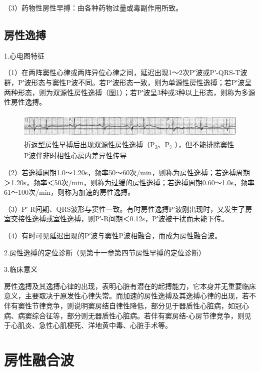 （3）药物性房性早搏：由各种药物过量或毒副作用所致。

\protect\hypertarget{text00007.htmlux5cux23subid23}{}{}

\subsection{房性逸搏}

1.心电图特征

（1）在两阵窦性心律或两阵异位心律之间，延迟出现1～2次P′波或P′-QRS-T波群，P′波形态与窦性P波不同。若P′波形态一致，则为单源性房性逸搏；若P′波呈两种形态，则为双源性房性逸搏（图\ref{fig1-26}）；若P′波呈3种或3种以上形态，则称为多源性房性逸搏。

\begin{figure}[!htbp]
 \centering
 \includegraphics[width=5.78125in,height=0.48958in]{./images/Image00032.jpg}
 \captionsetup{justification=centering}
 \caption{折返型房性早搏后出现双源性房性逸搏（P\textsubscript{3}、P\textsubscript{7} ），但不能排除窦性P波伴非时相性心房内差异性传导}
 \label{fig1-26}
  \end{figure} 


（2）若逸搏周期1.0～1.20s，频率50～60次/min，则称为房性逸搏；若逸搏周期＞1.20s，频率＜50次/min，则称为过缓的房性逸搏；若逸搏周期0.60～1.0s，频率61～100次/min，则称为加速的房性逸搏。

（3）P′-R间期、QRS波形与窦性一致。有时房性逸搏P′波刚出现时，又发生了房室交接性逸搏或室性逸搏，则P′-R间期＜0.12s，P′波被干扰而未能下传。

（4）有时可见延迟出现的P′波与窦性P波相融合，而成为房性融合波。

2.房性逸搏的定位诊断（见第十一章第四节房性早搏的定位诊断）

3.临床意义

房性逸搏及其逸搏心律的出现，表明心脏有潜在的起搏能力，它本身并无重要临床意义，主要取决于原发性心律失常。而加速的房性逸搏及其逸搏心律的出现，若不伴有窦性节律竞争，则说明窦房结自律性降低，部分见于器质性心脏病，如冠心病、病窦综合征等，部分则无器质性心脏病。若伴有窦房结-心房节律竞争，则见于心肌炎、急性心肌梗死、洋地黄中毒、心脏手术等。

\protect\hypertarget{text00007.htmlux5cux23subid24}{}{}

\section{房性融合波}

